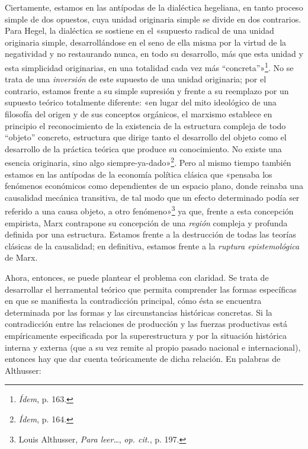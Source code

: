 Ciertamente, estamos en las antípodas de la dialéctica hegeliana, en tanto proceso simple de dos opuestos, cuya unidad originaria simple se divide en dos contrarios. Para Hegel, la dialéctica se sostiene en el «supuesto radical de una unidad originaria simple, desarrollándose en el seno de ella misma por la virtud de la negatividad y no restaurando nunca, en todo su desarrollo, más que esta unidad y esta simplicidad originarias, en una totalidad cada vez más ``concreta''»\footnote{\emph{Ídem}, p. 163.}. No se trata de una \emph{inversión} de este supuesto de una unidad originaria; por el contrario, estamos frente a su simple supresión y frente a su reemplazo por un supuesto teórico totalmente diferente: «en lugar del mito ideológico de una filosofía del origen y de sus conceptos orgánicos, el marxismo establece en principio el reconocimiento de la existencia de la estructura compleja de todo ``objeto'' concreto, estructura que dirige tanto el desarrollo del objeto como el desarrollo de la práctica teórica que produce su conocimiento. No existe una esencia originaria, sino algo siempre-ya-dado»\footnote{\emph{Ídem}, p. 164.}. Pero al mismo tiempo también estamos en las antípodas de la economía política clásica que «pensaba los fenómenos económicos como dependientes de un espacio plano, donde reinaba una causalidad mecánica transitiva, de tal modo que un efecto determinado podía ser referido a una causa objeto, a otro fenómeno»\footnote{Louis Althusser, \emph{Para leer}\ldots, \emph{op. cit.}, p. 197.} ya que, frente a esta concepción empirista, Marx contrapone su concepción de una \emph{región} compleja y profunda definida por una estructura. Estamos frente a la destrucción de todas las teorías clásicas de la causalidad; en definitiva, estamos frente a la \emph{ruptura epistemológica} de Marx.

Ahora, entonces, se puede plantear el problema con claridad. Se trata de desarrollar el herramental teórico que permita comprender las formas específicas en que se manifiesta la contradicción principal, cómo ésta se encuentra determinada por las formas y las circunstancias históricas concretas. Si la contradicción entre las relaciones de producción y las fuerzas productivas está empíricamente especificada por la superestructura y por la situación histórica interna y externa (que a su vez remite al propio pasado nacional e internacional), entonces hay que dar cuenta teóricamente de dicha relación. En palabras de Althusser:

